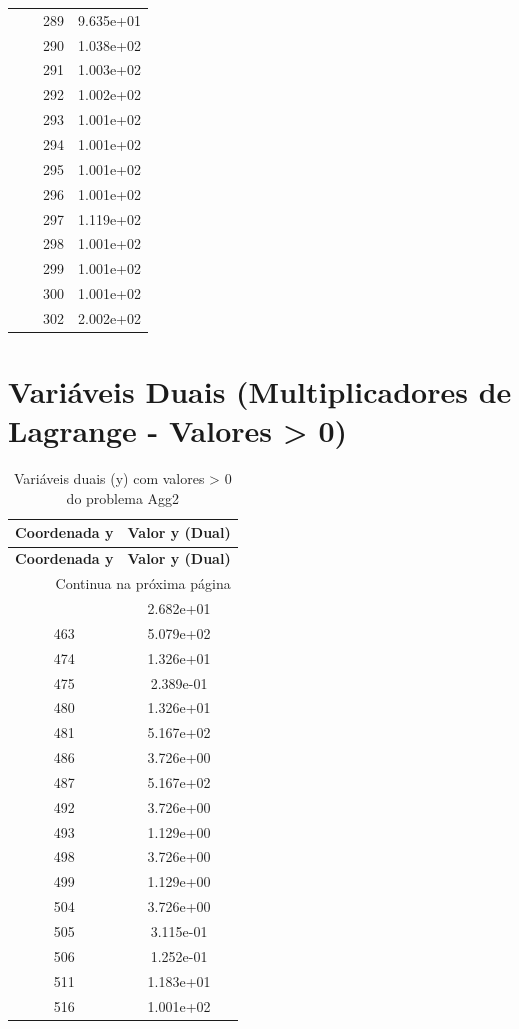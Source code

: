 \documentclass[12pt]{article}
\begin{document}
\begin{longtable}{@{}cccc@{}}
 &  & 289 & 9.635e+01 \\
 &  & 290 & 1.038e+02 \\
 &  & 291 & 1.003e+02 \\
 &  & 292 & 1.002e+02 \\
 &  & 293 & 1.001e+02 \\
 &  & 294 & 1.001e+02 \\
 &  & 295 & 1.001e+02 \\
 &  & 296 & 1.001e+02 \\
 &  & 297 & 1.119e+02 \\
 &  & 298 & 1.001e+02 \\
 &  & 299 & 1.001e+02 \\
 &  & 300 & 1.001e+02 \\
 &  & 302 & 2.002e+02 \\

\bottomrule
\end{longtable}


\section{Variáveis Duais (Multiplicadores de Lagrange - Valores > 0)}

\begin{longtable}{@{}cc@{}}
\caption{Variáveis duais (y) com valores > 0 do problema Agg2} \\
\toprule
\textbf{Coordenada y} & \textbf{Valor y (Dual)} \\
\midrule
\endfirsthead

\toprule
\textbf{Coordenada y} & \textbf{Valor y (Dual)} \\
\midrule
\endhead

\midrule \multicolumn{2}{r}{{Continua na próxima página}} \\ \midrule
\endfoot

\bottomrule
\endlastfoot
457 & 2.682e+01 \\
463 & 5.079e+02 \\
474 & 1.326e+01 \\
475 & 2.389e-01 \\
480 & 1.326e+01 \\
481 & 5.167e+02 \\
486 & 3.726e+00 \\
487 & 5.167e+02 \\
492 & 3.726e+00 \\
493 & 1.129e+00 \\
498 & 3.726e+00 \\
499 & 1.129e+00 \\
504 & 3.726e+00 \\
505 & 3.115e-01 \\
506 & 1.252e-01 \\
511 & 1.183e+01 \\
516 & 1.001e+02 \\

\bottomrule
\end{longtable}
\end{document}
